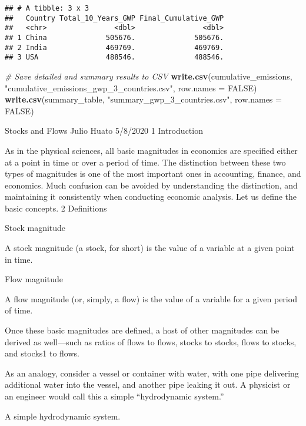 \documentclass[
]{article}
\newenvironment{Shaded}{\begin{snugshade}}{\end{snugshade}}
\newcommand{\AttributeTok}[1]{\textcolor[rgb]{0.13,0.29,0.53}{#1}}
\newcommand{\CommentTok}[1]{\textcolor[rgb]{0.56,0.35,0.01}{\textit{#1}}}
\newcommand{\ConstantTok}[1]{\textcolor[rgb]{0.56,0.35,0.01}{#1}}
\newcommand{\FunctionTok}[1]{\textcolor[rgb]{0.13,0.29,0.53}{\textbf{#1}}}
\newcommand{\NormalTok}[1]{#1}
\newcommand{\StringTok}[1]{\textcolor[rgb]{0.31,0.60,0.02}{#1}}
\begin{document}
\begin{verbatim}
## # A tibble: 3 x 3
##   Country Total_10_Years_GWP Final_Cumulative_GWP
##   <chr>                <dbl>                <dbl>
## 1 China              505676.              505676.
## 2 India              469769.              469769.
## 3 USA                488546.              488546.
\end{verbatim}

\begin{Shaded}
\begin{Highlighting}[]
\CommentTok{\# Save detailed and summary results to CSV}
\FunctionTok{write.csv}\NormalTok{(cumulative\_emissions, }\StringTok{"cumulative\_emissions\_gwp\_3\_countries.csv"}\NormalTok{, }\AttributeTok{row.names =} \ConstantTok{FALSE}\NormalTok{)}
\FunctionTok{write.csv}\NormalTok{(summary\_table, }\StringTok{"summary\_gwp\_3\_countries.csv"}\NormalTok{, }\AttributeTok{row.names =} \ConstantTok{FALSE}\NormalTok{)}
\end{Highlighting}
\end{Shaded}

Stocks and Flows Julio Huato 5/8/2020 1 Introduction

As in the physical sciences, all basic magnitudes in economics are
specified either at a point in time or over a period of time. The
distinction between these two types of magnitudes is one of the most
important ones in accounting, finance, and economics. Much confusion can
be avoided by understanding the distinction, and maintaining it
consistently when conducting economic analysis. Let us define the basic
concepts. 2 Definitions

Stock magnitude

A stock magnitude (a stock, for short) is the value of a variable at a
given point in time.

Flow magnitude

A flow magnitude (or, simply, a flow) is the value of a variable for a
given period of time.

Once these basic magnitudes are defined, a host of other magnitudes can
be derived as well---such as ratios of flows to flows, stocks to stocks,
flows to stocks, and stocks1 to flows.

As an analogy, consider a vessel or container with water, with one pipe
delivering additional water into the vessel, and another pipe leaking it
out. A physicist or an engineer would call this a simple ``hydrodynamic
system.''

A simple hydrodynamic system.
\end{document}
